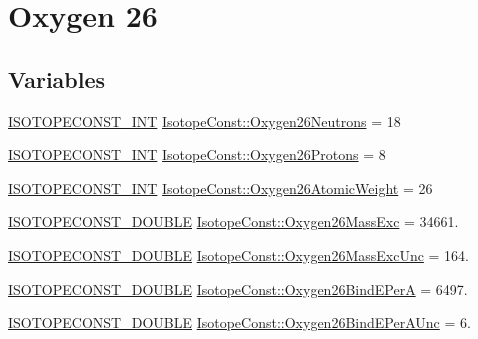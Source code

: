 \hypertarget{group___isotope_const-_oxygen-_o26}{}\section{Oxygen 26}
\label{group___isotope_const-_oxygen-_o26}
\subsection*{Variables}
\begin{DoxyCompactItemize}
\item 
\mbox{\hyperlink{group___isotope_const-_macros_ga5f18360b3e99483a35c32d789e62621c}{I\+S\+O\+T\+O\+P\+E\+C\+O\+N\+S\+T\+\_\+\+I\+NT}} \mbox{\hyperlink{group___isotope_const-_oxygen-_o26_gac8293fde7f7e72dbfa3e8a09dafdc997}{Isotope\+Const\+::\+Oxygen26\+Neutrons}} = 18
\item 
\mbox{\hyperlink{group___isotope_const-_macros_ga5f18360b3e99483a35c32d789e62621c}{I\+S\+O\+T\+O\+P\+E\+C\+O\+N\+S\+T\+\_\+\+I\+NT}} \mbox{\hyperlink{group___isotope_const-_oxygen-_o26_ga1c40665e5a089f34b4d474ef75a44170}{Isotope\+Const\+::\+Oxygen26\+Protons}} = 8
\item 
\mbox{\hyperlink{group___isotope_const-_macros_ga5f18360b3e99483a35c32d789e62621c}{I\+S\+O\+T\+O\+P\+E\+C\+O\+N\+S\+T\+\_\+\+I\+NT}} \mbox{\hyperlink{group___isotope_const-_oxygen-_o26_ga94513767de6ac4105934ea10a8b3688e}{Isotope\+Const\+::\+Oxygen26\+Atomic\+Weight}} = 26
\item 
\mbox{\hyperlink{group___isotope_const-_macros_ga8f45a7272ce02c0b4c65c44636ed719a}{I\+S\+O\+T\+O\+P\+E\+C\+O\+N\+S\+T\+\_\+\+D\+O\+U\+B\+LE}} \mbox{\hyperlink{group___isotope_const-_oxygen-_o26_ga6669bbcbc1a503cbf6b654fafdaae8d1}{Isotope\+Const\+::\+Oxygen26\+Mass\+Exc}} = 34661.
\item 
\mbox{\hyperlink{group___isotope_const-_macros_ga8f45a7272ce02c0b4c65c44636ed719a}{I\+S\+O\+T\+O\+P\+E\+C\+O\+N\+S\+T\+\_\+\+D\+O\+U\+B\+LE}} \mbox{\hyperlink{group___isotope_const-_oxygen-_o26_ga1c5170853a176c27526e20ab8e673f05}{Isotope\+Const\+::\+Oxygen26\+Mass\+Exc\+Unc}} = 164.
\item 
\mbox{\hyperlink{group___isotope_const-_macros_ga8f45a7272ce02c0b4c65c44636ed719a}{I\+S\+O\+T\+O\+P\+E\+C\+O\+N\+S\+T\+\_\+\+D\+O\+U\+B\+LE}} \mbox{\hyperlink{group___isotope_const-_oxygen-_o26_gaf3718d2cb2c0ef198fcde0d03ea7793d}{Isotope\+Const\+::\+Oxygen26\+Bind\+E\+PerA}} = 6497.
\item 
\mbox{\hyperlink{group___isotope_const-_macros_ga8f45a7272ce02c0b4c65c44636ed719a}{I\+S\+O\+T\+O\+P\+E\+C\+O\+N\+S\+T\+\_\+\+D\+O\+U\+B\+LE}} \mbox{\hyperlink{group___isotope_const-_oxygen-_o26_ga9564f6726a264e1a2ab85b1c13c73012}{Isotope\+Const\+::\+Oxygen26\+Bind\+E\+Per\+A\+Unc}} = 6.

\end{DoxyCompactItemize}
